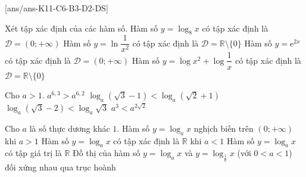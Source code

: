 \cauds
{}[ans/ans-K11-C6-B3-D2-DS]

\begin{ex}%
	Xét tập xác định của các hàm số.
	\choiceTF
	{\True Hàm số $y = \log_8 x$ có tập xác định là $\mathscr{D} = (0;+\infty)$}
	{\True Hàm số $y = \ln \dfrac{1}{x^2}$ có tập xác định là $\mathscr{D} = \mathbb{R}\setminus \{0\}$}
	{Hàm số $y=\mathrm{e}^{2x}$ có tập xác định là $\mathscr{D} = (0;+\infty)$}
	{Hàm số $y = \log x^2 + \log\dfrac{1}{x}$ có tập xác định là $\mathscr{D} = \mathbb{R}\setminus \{0\}$}
\end{ex}

\begin{ex}%
	Cho $a>1$.
	\choiceTF
	{\True $a^{6{,}3} > a^{6{,}2}$}
	{\True $\log_a (\sqrt{3} - 1) < \log_a (\sqrt{2} + 1)$}
	{$\log_a (\sqrt{3} - 2) < \log_a \sqrt{3}$}
	{$a^{3} < a^{2\sqrt{2}}$}
\end{ex}

\begin{ex}%
	Cho $a$ là số thực dương khác $1$.
	\choiceTF
	{Hàm số $y=\log_a x$ nghịch biến trên $(0;+\infty)$ khi $a>1$}
	{Hàm số $y=\log_a x$ có tập xác định là $\mathbb{R}$ khi $a<1$}
	{\True Hàm số $y=\log_a x$ có tập giá trị là $\mathbb{R}$}
	{\True Đồ thị của hàm số $y=\log_a x$ và $y=\log_{\tfrac{1}{a}} x$ (với $0<a<1$) đối xứng nhau qua trục hoành}
\end{ex}

